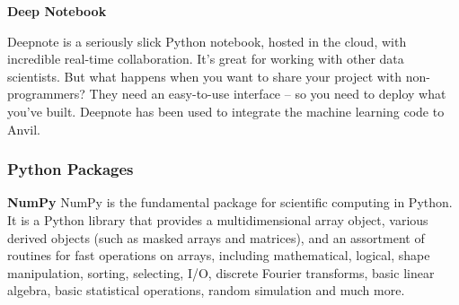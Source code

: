 \documentclass[12pt]{article}
\begin{document}
\textbf{Deep Notebook}

Deepnote is a seriously slick Python notebook, hosted in the cloud, with incredible real-time collaboration. It’s great for working with other data scientists. But what happens when you want to share your project with non-programmers? They need an easy-to-use interface – so you need to deploy what you’ve built. Deepnote has been used to integrate the machine learning code to Anvil.
\newpage
\subsubsection{Python Packages}
\textbf{NumPy}
NumPy is the fundamental package for scientific computing in Python. It is a Python library that provides a multidimensional array object, various derived objects (such as masked arrays and matrices), and an assortment of routines for fast operations on arrays, including mathematical, logical, shape manipulation, sorting, selecting, I/O, discrete Fourier transforms, basic linear algebra, basic statistical operations, random simulation and much more.
\end{document}
